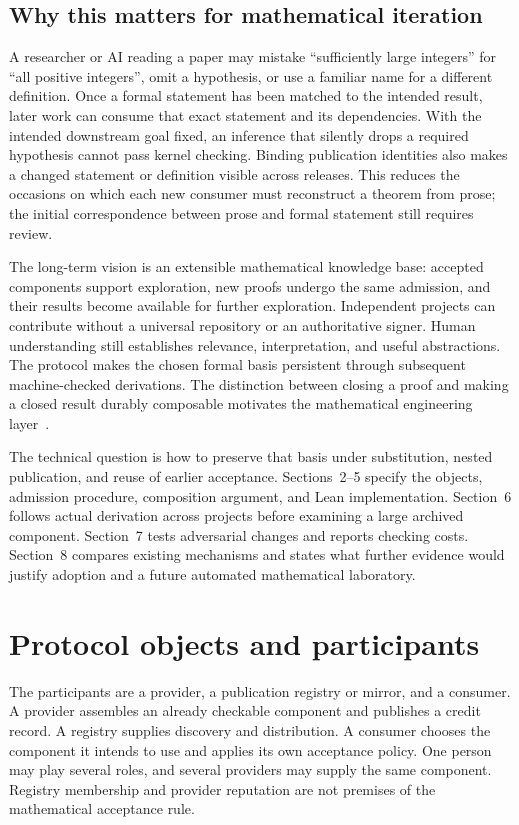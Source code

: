 \documentclass[11pt]{article}
\begin{document}
\subsection{Why this matters for mathematical iteration}

A researcher or AI reading a paper may mistake ``sufficiently large integers''
for ``all positive integers'', omit a hypothesis, or use a familiar name for a
different definition. Once a formal statement has been matched to the intended
result, later work can consume that exact statement and its dependencies.
With the intended downstream goal fixed, an inference that silently drops a
required hypothesis cannot pass kernel checking. Binding publication identities
also makes a changed statement or definition visible across releases. This
reduces the occasions on which each new consumer must reconstruct a theorem
from prose; the initial correspondence between prose and formal statement
still requires review.

The long-term vision is an extensible mathematical knowledge base: accepted
components support exploration, new proofs undergo the same admission, and
their results become available for further exploration. Independent projects
can contribute without a universal repository or an authoritative signer.
Human understanding still establishes relevance, interpretation, and useful
abstractions. The protocol makes the chosen formal basis persistent through
subsequent machine-checked derivations. The distinction between closing a proof
and making a closed result durably composable motivates the mathematical
engineering layer~\citep{engineering}.

The technical question is how to preserve that basis under substitution,
nested publication, and reuse of earlier acceptance. Sections~2--5 specify
the objects, admission procedure, composition argument, and Lean implementation.
Section~6 follows actual derivation across projects before examining a large
archived component. Section~7 tests adversarial changes and reports checking
costs. Section~8 compares existing mechanisms and states what further evidence
would justify adoption and a future automated mathematical laboratory.

\section{Protocol objects and participants}

The participants are a provider, a publication registry or mirror, and a
consumer. A provider assembles an already checkable component and publishes a
credit record. A registry supplies discovery and distribution. A consumer
chooses the component it intends to use and applies its own acceptance policy.
One person may play several roles, and several providers may supply the same
component. Registry membership and provider reputation are not premises of
the mathematical acceptance rule.
\end{document}
